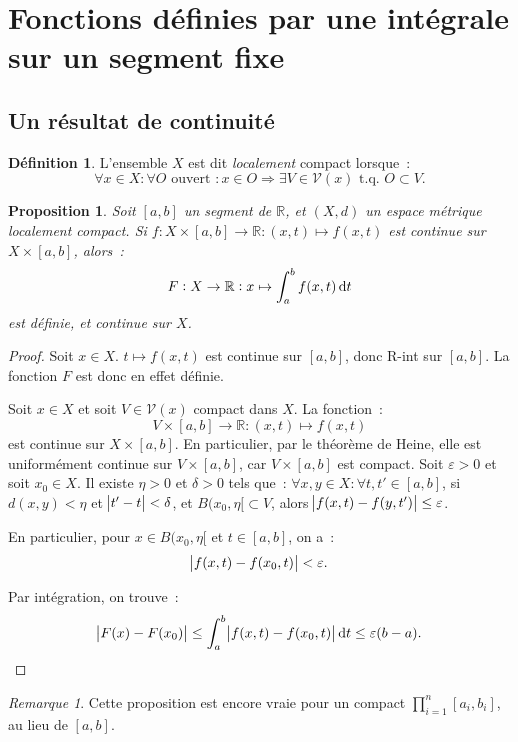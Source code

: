 \documentclass{report}
\newtheorem{prp}[thm]{Proposition}
\theoremstyle{definition}
\newtheorem{déf}[thm]{Définition}
\theoremstyle{remark}
\newtheorem*{rmq}{Remarque}
\newcommand{\R}{\mathbb R}
\newcommand{\tq}{\text{ t.q. }}
\begin{document}
	\section{Fonctions définies par une intégrale sur un segment fixe}
		\subsection{Un résultat de continuité}
			\begin{déf} L'ensemble $X$ est dit \textit{localement} compact lorsque~:
			\[\forall x \in X : \forall O \text{ ouvert } : x \in O \Rightarrow \exists V \in \mathcal V(x) \tq O \subset V.\]
			\end{déf}

			\begin{prp}\label{prp:intparamcontinuesidefsurcpct} Soit $[a, b]$ un segment de $\R$, et $(X, d)$ un espace métrique localement compact.
			Si $f : X \times [a, b] \to \R : (x, t) \mapsto f(x, t)$ est continue sur $X \times [a, b]$, alors~:
			\[F : X \to \R : x \mapsto \int_a^bf(x, t)\dif t\]
			est définie, et continue sur $X$.
			\end{prp}

			\begin{proof} Soit $x \in X$. $t \mapsto f(x, t)$ est continue sur $[a, b]$, donc R-int sur $[a, b]$. La fonction $F$ est donc en effet définie.

			Soit $x \in X$ et soit $V \in \mathcal V(x)$ compact dans $X$. La fonction~:
			\[V \times [a, b] \to \R : (x, t) \mapsto f(x, t)\]
			est continue sur $X \times [a, b]$. En particulier, par le théorème de Heine, elle est uniformément continue sur $V \times [a, b]$, car $V \times [a, b]$
			est compact. Soit $\varepsilon > 0$ et soit $x_0 \in X$. Il existe $\eta > 0$ et $\delta > 0$ tels que~: $\forall x, y \in X : \forall t, t' \in [a, b]$,
			si $d(x, y) < \eta$ et $\abs {t'-t} < \delta$, et $B(x_0, \eta[ \subset V$, alors $\abs {f(x, t) - f(y, t')} \leq \varepsilon$.

			En particulier, pour $x \in B(x_0, \eta[$ et $t \in [a, b]$, on a~:
			\[\abs {f(x, t) - f(x_0, t)} < \varepsilon.\]

			Par intégration, on trouve~:
			\[\abs {F(x) - F(x_0)} \leq \int_a^b\abs {f(x, t) - f(x_0, t)}\dif t \leq \varepsilon (b-a).\]
			\end{proof}

			\begin{rmq} Cette proposition est encore vraie pour un compact $\prod_{i=1}^n[a_i, b_i]$, au lieu de $[a, b]$.
			\end{rmq}
\end{document}
